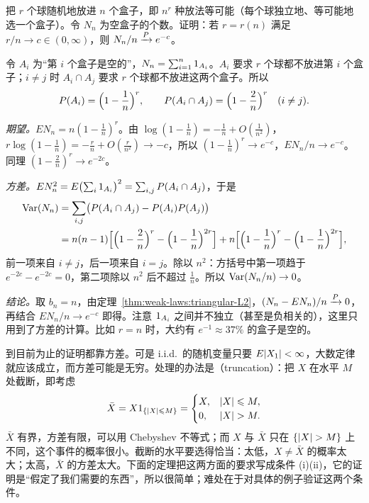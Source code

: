 \begin{workedexample}[占位问题]\label{we:weak-laws:occupancy}
把 $r$ 个球随机地放进 $n$ 个盒子，即 $n^r$ 种放法等可能（每个球独立地、等可能地选一个盒子）。令 $N_n$ 为空盒子的个数。证明：若 $r=r(n)$ 满足 $r/n\to c\in(0,\infty)$，则 $N_n/n\xrightarrow{P} e^{-c}$。
\end{workedexample}
\begin{solution}
令 $A_i$ 为“第 $i$ 个盒子是空的”，$N_n=\sum_{i=1}^n1_{A_i}$。$A_i$ 要求 $r$ 个球都不放进第 $i$ 个盒子；$i\neq j$ 时 $A_i\cap A_j$ 要求 $r$ 个球都不放进这两个盒子。所以
\[
P(A_i)=\Bigl(1-\frac1n\Bigr)^r,\qquad P(A_i\cap A_j)=\Bigl(1-\frac2n\Bigr)^r\quad(i\neq j).
\]

\emph{期望。}$EN_n=n(1-\frac1n)^r$。由 $\log(1-\frac1n)=-\frac1n+O(\frac1{n^2})$，$r\log(1-\frac1n)=-\frac rn+O(\frac r{n^2})\to-c$，所以 $(1-\frac1n)^r\to e^{-c}$，$EN_n/n\to e^{-c}$。同理 $(1-\frac2n)^r\to e^{-2c}$。

\emph{方差。}$EN_n^2=E\bigl(\sum_i1_{A_i}\bigr)^2=\sum_{i,j}P(A_i\cap A_j)$，于是
\[
\begin{aligned}
\operatorname{Var}(N_n)&=\sum_{i,j}\bigl(P(A_i\cap A_j)-P(A_i)P(A_j)\bigr)\\
&=n(n-1)\Bigl[\Bigl(1-\frac2n\Bigr)^r-\Bigl(1-\frac1n\Bigr)^{2r}\Bigr]+n\Bigl[\Bigl(1-\frac1n\Bigr)^r-\Bigl(1-\frac1n\Bigr)^{2r}\Bigr],
\end{aligned}
\]
前一项来自 $i\neq j$，后一项来自 $i=j$。除以 $n^2$：方括号中第一项趋于 $e^{-2c}-e^{-2c}=0$，第二项除以 $n^2$ 后不超过 $\frac1n$。所以 $\operatorname{Var}(N_n/n)\to0$。

\emph{结论。}取 $b_n=n$，由定理~\ref{thm:weak-laws:triangular-L2}，$(N_n-EN_n)/n\xrightarrow{P}0$，再结合 $EN_n/n\to e^{-c}$ 即得。注意 $1_{A_i}$ 之间并不独立（甚至是负相关的），这里只用到了方差的计算。比如 $r=n$ 时，大约有 $e^{-1}\approx37\%$ 的盒子是空的。
\end{solution}


到目前为止的证明都靠方差。可是 i.i.d.\ 的随机变量只要 $E\lvert X_1\rvert<\infty$，大数定律就应该成立，而方差可能是无穷。处理的办法是（truncation）：把 $X$ 在水平 $M$ 处截断，即考虑
\[
\bar X=X1_{\{\lvert X\rvert\leqslant M\}}=\begin{cases}X,&\lvert X\rvert\leqslant M,\\0,&\lvert X\rvert>M.\end{cases}
\]
$\bar X$ 有界，方差有限，可以用 Chebyshev 不等式；而 $X$ 与 $\bar X$ 只在 $\{\lvert X\rvert>M\}$ 上不同，这个事件的概率很小。截断的水平要选得恰当：太低，$X\neq\bar X$ 的概率太大；太高，$\bar X$ 的方差太大。下面的定理把这两方面的要求写成条件 (i)(ii)，它的证明是“假定了我们需要的东西”，所以很简单；难处在于对具体的例子验证这两个条件。

